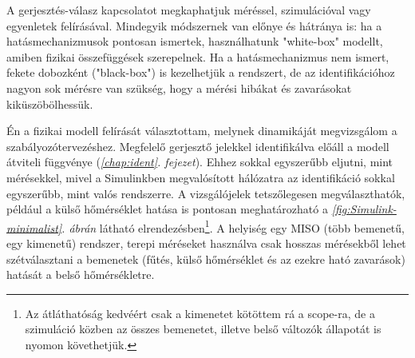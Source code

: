 
A gerjesztés-válasz kapcsolatot megkaphatjuk méréssel, szimulációval vagy egyenletek felírásával. Mindegyik módszernek van előnye és hátránya is:  ha a hatásmechanizmusok pontosan ismertek, használhatunk "white-box" modellt, amiben fizikai összefüggések szerepelnek. Ha a hatásmechanizmus nem ismert, fekete dobozként ("black-box") is kezelhetjük a rendszert, de az identifikációhoz nagyon sok mérésre van szükség, hogy a mérési hibákat és zavarásokat kiküszöbölhessük.%

Én a fizikai modell felírását választottam, melynek dinamikáját megvizsgálom a szabályozótervezéshez. Megfelelő gerjesztő jelekkel identifikálva előáll a modell átviteli függvénye (\textit{\ref{chap:ident}. fejezet}). Ehhez sokkal egyszerűbb eljutni, mint mérésekkel, mivel a Simulinkben megvalósított hálózatra az identifikáció sokkal egyszerűbb, mint valós rendszerre. A vizsgálójelek tetszőlegesen megválaszthatók, például a külső hőmérséklet hatása is pontosan meghatározható a \textit{\ref{fig:Simulink-minimalist}. ábrán} látható elrendezésben\footnote{Az átláthatóság kedvéért csak a kimenetet kötöttem rá a scope-ra, de a szimuláció közben az összes bemenetet, illetve belső változók állapotát is nyomon követhetjük.}. A helyiség egy MISO (több bemenetű, egy kimenetű) rendszer, terepi méréseket használva csak hosszas mérésekből lehet szétválasztani a bemenetek (fűtés, külső hőmérséklet és az ezekre ható zavarások) hatását a belső hőmérsékletre.






%

